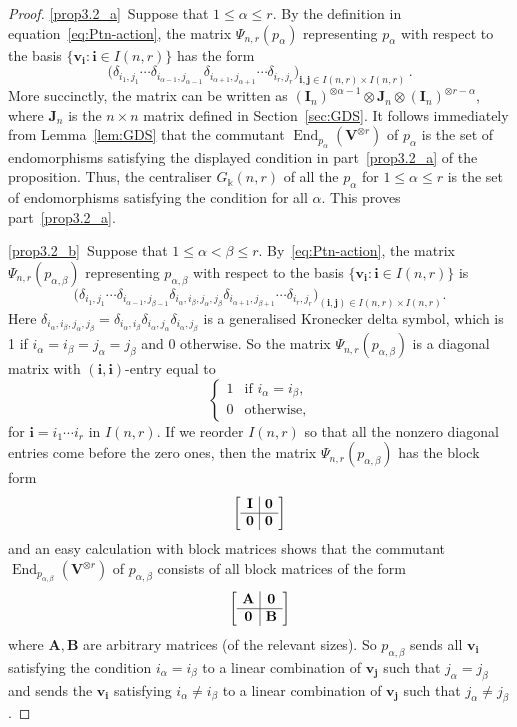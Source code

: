 \documentclass[10pt]{article}
\theoremstyle{definition}
\DeclareMathOperator{\End}{End}
\newcommand{\bi}{{\boldsymbol{i}}} %
\newcommand{\bj}{{\boldsymbol{j}}}
\newcommand{\bA}{\mathbf{A}}
\newcommand{\bB}{\mathbf{B}}
\newcommand{\bJ}{\mathbf{J}}
\newcommand{\bI}{\mathbf{I}}
\newcommand{\bzero}{\mathbf{0}}
\newcommand{\V}{\mathbf{V}} %
\newcommand{\bv}{\mathbf{v}} %
\begin{document}
\begin{proof}
%
\ref{prop3.2_a}~Suppose that $1 \le \alpha \le r$. By the definition in equation~\eqref{eq:Ptn-action}, the matrix $\Psi_{n,r}(p_{\alpha})$ representing $p_{\alpha}$ with respect to the basis $\{\bv_\bi : \bi \in I(n,r)\}$ has the form
\[
\big( \delta_{i_1,j_1} \cdots \delta_{i_{\alpha-1}, j_{\alpha-1}}
\delta_{i_{\alpha+1}, j_{\alpha+1}} \cdots \delta_{i_r, j_r} \big)_{\bi,\bj
 \in I(n,r) \times I(n,r)} \, .
\]
More succinctly, the matrix can be written as $(\bI_n)^{\otimes
 \alpha-1} \otimes \bJ_n \otimes (\bI_n)^{\otimes r-\alpha}$, where
$\bJ_n$ is the $n \times n$ matrix defined in Section~\ref{sec:GDS}. It follows immediately from Lemma~\ref{lem:GDS} that
the commutant $\End_{p_\alpha}(\V^{\otimes r})$ of $p_\alpha$
is the set of endomorphisms satisfying the displayed condition in part~\ref{prop3.2_a} of the proposition. Thus, the centraliser $G_\Bbbk(n,r)$ of all
the $p_\alpha$ for $1 \le \alpha \le r$ is the set of endomorphisms
satisfying the condition for all $\alpha$. This proves part~\ref{prop3.2_a}.
 
\ref{prop3.2_b}~Suppose that $1 \le \alpha < \beta \le r$. By~\eqref{eq:Ptn-action}, the matrix $\Psi_{n,r}(p_{\alpha,\beta})$
representing $p_{\alpha,\beta}$ with respect to the basis $\{\bv_\bi :
\bi \in I(n,r)\}$ is
\[
\big( \delta_{i_{1},j_{1}} \cdots \delta_{i_{\alpha-1},j_{\beta-1}}
\delta_{i_\alpha, i_\beta, j_\alpha, j_\beta} \delta_{i_{\alpha+1},j_{\beta+1}} \cdots
\delta_{i_r,j_r} \big)_{(\bi,\bj) \in I(n,r) \times I(n,r)}.
\]
Here $\delta_{i_\alpha, i_\beta, j_\alpha, j_\beta} = \delta_{i_\alpha,
 i_\beta} \delta_{i_\alpha, j_\alpha} \delta_{i_\alpha, j_\beta}$ is a
generalised Kronecker delta symbol, which is 1 if
$i_\alpha=i_\beta=j_\alpha=j_\beta$ and 0 otherwise. So the matrix
$\Psi_{n,r}(p_{\alpha,\beta})$ is a diagonal matrix with
$(\bi,\bi)$-entry equal to
\[
\begin{cases}
 1 & \text{if } i_\alpha
 = i_\beta ,\\
 0 & \text{otherwise},
\end{cases}
\]
for $\bi = i_1 \cdots i_r$ in $I(n,r)$. If we reorder $I(n,r)$ so
that all the nonzero diagonal entries come before the zero ones, then
the matrix $\Psi_{n,r}(p_{\alpha,\beta})$ has the block form
 \[
\setlength{\arraycolsep}{4pt}
 \left[\begin{array}{c|c} {\bI} & \bzero \\ \hline \bzero &
 \bzero\end{array}\right]
 \]
and an easy calculation with block matrices shows that the commutant
$\End_{p_{\alpha,\beta}}(\V^{\otimes r})$ of $p_{\alpha,\beta}$
consists of all block matrices of the form
 \[
\setlength{\arraycolsep}{4pt}
 \left[\begin{array}{c|c}
 \bA & \bzero \\ \hline \bzero & \bB
 \end{array}\right]
 \]
where $\bA, \bB $ are arbitrary matrices (of the relevant sizes). So
$p_{\alpha,\beta}$ sends all $\bv_\bi$ satisfying the condition
$i_\alpha = i_\beta$ to a linear combination of $\bv_\bj$ such that
$j_\alpha = j_\beta$ and sends the $\bv_\bi$ satisfying $i_\alpha \ne
i_\beta$ to a linear combination of $\bv_\bj$ such that $j_\alpha \ne
j_\beta$.


\end{proof}
\end{document}
